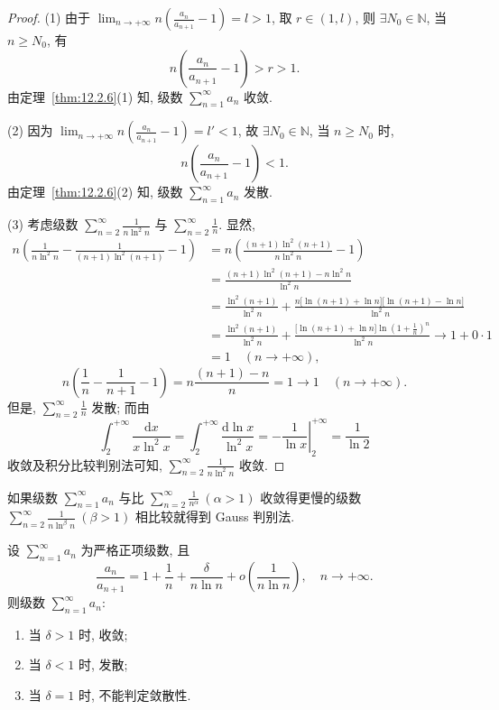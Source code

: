 \begin{proof}
(1) 由于 $\lim_{n\to+\infty}n\left(\frac{a_{n}}{a_{n+1}}-1\right)=l>1$, 取 $r\in(1,l)$, 则 $\exists N_{0}\in\mathbb{N}$, 当 $n\geqslant N_{0}$, 有
\[
  n\left(\frac{a_{n}}{a_{n+1}}-1\right)>r>1.
\]
由定理~\ref{thm:12.2.6}(1) 知, 级数 $\sum_{n=1}^{\infty}a_{n}$ 收敛.

(2) 因为 $\lim_{n\to+\infty}n\left(\frac{a_{n}}{a_{n+1}}-1\right)=l'<1$, 故 $\exists N_{0}\in\mathbb{N}$, 当 $n\geqslant N_{0}$ 时,
\[
  n\left(\frac{a_{n}}{a_{n+1}}-1\right)<1.
\]
由定理~\ref{thm:12.2.6}(2) 知, 级数 $\sum_{n=1}^{\infty}a_{n}$ 发散.

(3) 考虑级数 $\sum_{n=2}^{\infty}\frac{1}{n\ln^{2}n}$ 与 $\sum_{n=2}^{\infty}\frac{1}{n}$. 显然,
\begin{align*}
  n\left(\frac{1}{n\ln^{2}n}-\frac{1}{(n+1)\ln^{2}(n+1)}-1\right)
  &=n\left(\frac{(n+1)\ln^{2}(n+1)}{n\ln^{2}n}-1\right) \\
  &=\frac{(n+1)\ln^{2}(n+1)-n\ln^{2}n}{\ln^{2}n} \\
  &=\frac{\ln^{2}(n+1)}{\ln^{2}n}
   +\frac{n\bigl[\ln(n+1)+\ln n\bigr]\bigl[\ln(n+1)-\ln n\bigr]}{\ln^{2}n} \\
  &=\frac{\ln^{2}(n+1)}{\ln^{2}n}
   +\frac{\bigl[\ln(n+1)+\ln n\bigr]\ln\left(1+\frac{1}{n}\right)^{n}}{\ln^{2}n}
   \to1+0\cdot1 \\
  &=1\quad(n\to+\infty),
\end{align*}
\[
  n\left(\frac{1}{n}-\frac{1}{n+1}-1\right)=n\frac{(n+1)-n}{n}=1\to1\quad(n\to+\infty).
\]
但是, $\sum_{n=2}^{\infty}\frac{1}{n}$ 发散; 而由
\[
  \int_{2}^{+\infty}\frac{\mathrm{d}x}{x\ln^{2}x}
  =\int_{2}^{+\infty}\frac{\mathrm{d}\ln x}{\ln^{2}x}
  =-\left.\frac{1}{\ln x}\right|_{2}^{+\infty}
  =\frac{1}{\ln2}
\]
收敛及积分比较判别法可知, $\sum_{n=2}^{\infty}\frac{1}{n\ln^{2}n}$ 收敛.
\end{proof}

如果级数 $\sum_{n=1}^{\infty}a_{n}$ 与比 $\sum_{n=2}^{\infty}\frac{1}{n^{\alpha}}\ (\alpha>1)$ 收敛得更慢的级数 $\sum_{n=2}^{\infty}\frac{1}{n\ln^{\beta}n}\ (\beta>1)$ 相比较就得到 Gauss 判别法.

\begin{theorem}\label{thm:12.2.7}
设 $\sum_{n=1}^{\infty}a_{n}$ 为严格正项级数, 且
\[
  \frac{a_{n}}{a_{n+1}}=1+\frac{1}{n}+\frac{\delta}{n\ln n}+o\left(\frac{1}{n\ln n}\right),\quad n\to+\infty.
\]
则级数 $\sum_{n=1}^{\infty}a_{n}$:
\begin{enumerate}
  \item 当 $\delta>1$ 时, 收敛;
  \item 当 $\delta<1$ 时, 发散;
  \item 当 $\delta=1$ 时, 不能判定敛散性.
\end{enumerate}
\end{theorem}

